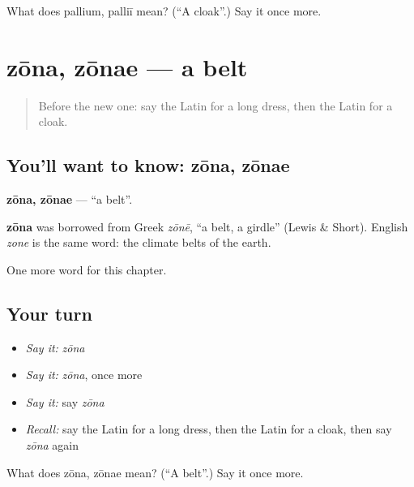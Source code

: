 \begin{tcolorbox}[breakable,colback=teal!4,colframe=teal!35!black,title={Before you move on}]
What does pallium, palliī mean? (\textquotedblleft{}A cloak\textquotedblright{}.) Say it once more.
\end{tcolorbox}
\section[zōna, zōnae]{zōna, zōnae — a belt}

\label{lesson:LA-C126-zona}



\begin{quote}
Before the new one: say the Latin for a long dress, then the Latin for a cloak.
\end{quote}

\subsection*{You'll want to know: zōna, zōnae}
\textbf{zōna, zōnae} — \textquotedblleft{}a belt\textquotedblright{}.

\begin{cousinweb}
\textbf{zōna} was borrowed from Greek \emph{zōnē}, \textquotedblleft{}a belt, a girdle\textquotedblright{} (Lewis \& Short). English \emph{zone} is the same word: the climate belts of the earth.
\end{cousinweb}

\begin{grammarlens}[title={What you've built}]
One more word for this chapter.
\end{grammarlens}

\subsection*{Your turn}
\begin{itemize}
\raggedright
  \item \emph{Say it:} \emph{zōna}
  \item \emph{Say it:} \emph{zōna}, once more
  \item \emph{Say it:} say \emph{zōna}
  \item \emph{Recall:} say the Latin for a long dress, then the Latin for a cloak, then say \emph{zōna} again
\end{itemize}

\begin{tcolorbox}[breakable,colback=teal!4,colframe=teal!35!black,title={Before you move on}]
What does zōna, zōnae mean? (\textquotedblleft{}A belt\textquotedblright{}.) Say it once more.
\end{tcolorbox}
